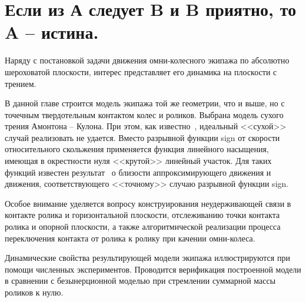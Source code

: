 \section{Если из А следует B и B приятно, то A -- истина.}

%
Наряду с постановкой задачи движения омни-колесного экипажа по абсолютно шероховатой плоскости, интерес представляет его динамика на плоскости с трением.

В данной главе строится модель экипажа той же геометрии, что и выше,
но с точечным твердотельным контактом колес и роликов.
Выбрана модель сухого трения Амонтона -- Кулона. При этом, как известно~\cite{Novozhilov1991}, 
идеальный <<сухой>> случай реализовать не удается. Вместо разрывной функции 
sign от скорости относительного скольжения применяется функция линейного насыщения,
имеющая в окрестности нуля <<крутой>> линейный участок. Для таких функций известен 
результат~\cite{Novozhilov1991} о близости аппроксимирующего движения и движения, 
соответствующего <<точному>> случаю разрывной функции sign. 


Особое внимание уделяется вопросу конструирования неудерживающей связи в контакте ролика и горизонтальной плоскости,
отслеживанию точки контакта ролика и опорной плоскости,
а также алгоритмической реализации процесса 
переключения контакта от ролика к ролику при качении омни-колеса.

Динамические свойства результирующей модели экипажа иллюстрируются при помощи численных экспериментов.
Проводится верификация построенной модели в сравнении с безынерционной моделью при стремлении суммарной массы роликов к нулю.

